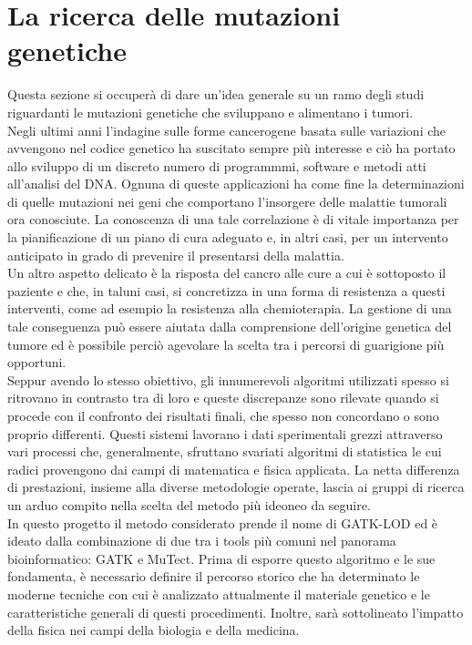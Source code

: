 \section{La ricerca delle mutazioni genetiche}
Questa sezione si occuperà di dare un'idea generale su un ramo degli studi riguardanti le mutazioni genetiche che sviluppano e alimentano i tumori. \\
Negli ultimi anni l'indagine sulle forme cancerogene basata sulle variazioni che avvengono nel codice genetico ha suscitato sempre più interesse e ciò ha portato allo sviluppo di un discreto numero di programmmi, software e metodi atti all'analisi del DNA. Ognuna di queste applicazioni ha come fine la determinazioni di quelle mutazioni nei geni che comportano l'insorgere delle malattie tumorali ora conosciute. La conoscenza di una tale correlazione è di vitale importanza per la pianificazione di un piano di cura adeguato e, in altri casi, per un intervento anticipato in grado di prevenire il presentarsi della malattia. \\
Un altro aspetto delicato è la risposta del cancro alle cure a cui è sottoposto il paziente e che, in taluni casi, si concretizza in una forma di resistenza a questi interventi, come ad esempio la resistenza alla chemioterapia. La gestione di una tale conseguenza può essere aiutata dalla comprensione dell'origine genetica del tumore ed è possibile perciò agevolare la scelta tra i percorsi di guarigione più opportuni. \\   
Seppur avendo lo stesso obiettivo, gli innumerevoli algoritmi utilizzati spesso si ritrovano in contrasto tra di loro e queste discrepanze sono rilevate quando si procede con il confronto dei risultati finali, che spesso non concordano o sono proprio differenti. Questi sistemi lavorano i dati sperimentali grezzi attraverso vari processi che, generalmente, sfruttano svariati algoritmi di statistica le cui radici provengono dai campi di matematica e fisica applicata. La netta differenza di prestazioni, insieme alla diverse metodologie operate, lascia ai gruppi di ricerca un arduo compito nella scelta del metodo più ideoneo da seguire. \\
In questo progetto il metodo considerato prende il nome di GATK-LOD ed è ideato dalla combinazione di due tra i tools più comuni nel panorama bioinformatico: GATK e MuTect. Prima di esporre questo algoritmo e le sue fondamenta, è necessario definire il percorso storico che ha determinato le moderne tecniche con cui è analizzato attualmente il materiale genetico e le caratteristiche generali di questi procedimenti. Inoltre, sarà sottolineato l'impatto della fisica nei campi della biologia e della medicina. 

